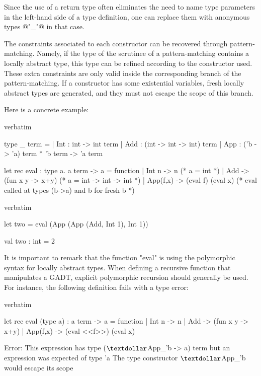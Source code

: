 Since the use of a return type often eliminates the need to name type
parameters in the left-hand side of a type definition, one can replace
them with anonymous types @"_"@ in that case.

The constraints associated to each constructor can be recovered
through pattern-matching.
Namely, if the type of the scrutinee of a pattern-matching contains
a locally abstract type, this type can be refined according to the
constructor used.
These extra constraints are only valid inside the corresponding branch
of the pattern-matching.
If a constructor has some existential variables, fresh locally
abstract types are generated, and they must not escape the
scope of this branch.


Here is a concrete example:
\begin{camlexample}{verbatim}
\begin{caml}
\begin{camlinput}
type _ term =
  | Int : int -> int term
  | Add : (int -> int -> int) term
  | App : ('b -> 'a) term * 'b term -> 'a term

let rec eval : type a. a term -> a = function
  | Int n    -> n                 (* a = int *)
  | Add      -> (fun x y -> x+y)  (* a = int -> int -> int *)
  | App(f,x) -> (eval f) (eval x)
          (* eval called at types (b->a) and b for fresh b *)
\end{camlinput}
\end{caml}
\end{camlexample}
\begin{camlexample}{verbatim}
\begin{caml}
\begin{camlinput}
let two = eval (App (App (Add, Int 1), Int 1))
\end{camlinput}
\begin{camloutput}
val two : int = 2
\end{camloutput}
\end{caml}
\end{camlexample}
It is important to remark that the function "eval" is using the
polymorphic syntax for locally abstract types. When defining a recursive
function that manipulates a GADT, explicit polymorphic recursion should
generally be used. For instance, the following definition fails with a
type error:
\begin{camlexample}{verbatim}
\begin{caml}
\begin{camlinput}
let rec eval (type a) : a term -> a = function
  | Int n    -> n
  | Add      -> (fun x y -> x+y)
  | App(f,x) -> (eval <<f>>) (eval x)
\end{camlinput}
\begin{camlerror}
Error: This expression has type ($\textdollar$App_'b -> a) term
       but an expression was expected of type 'a
       The type constructor $\textdollar$App_'b would escape its scope
\end{camlerror}
\end{caml}
\end{camlexample}
